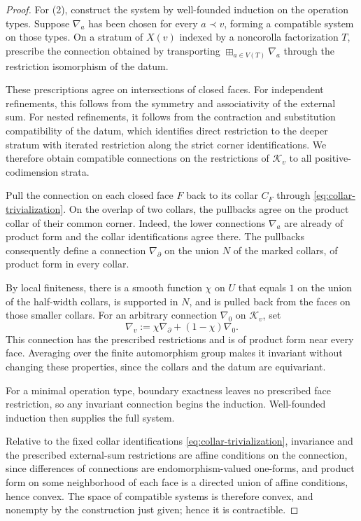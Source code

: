\documentclass[11pt,letterpaper,twoside]{article}
\theoremstyle{plain}
\theoremstyle{definition}
\theoremstyle{remark}
\begin{document}
\begin{proof}
For (2), construct the system by well-founded induction on the operation types.  Suppose \(\nabla_a\) has been chosen for every \(a\prec v\), forming a compatible system on those types.  On a stratum of \(X(v)\) indexed by a noncorolla factorization \(T\), prescribe the connection obtained by transporting \(\boxplus_{a\in V(T)}\nabla_a\) through the restriction isomorphism of the datum.

These prescriptions agree on intersections of closed faces.  For independent refinements, this follows from the symmetry and associativity of the external sum.  For nested refinements, it follows from the contraction and substitution compatibility of the datum, which identifies direct restriction to the deeper stratum with iterated restriction along the strict corner identifications.  We therefore obtain compatible connections on the restrictions of \(\mathcal K_v\) to all positive-codimension strata.

Pull the connection on each closed face \(F\) back to its collar \(C_F\) through \eqref{eq:collar-trivialization}.  On the overlap of two collars, the pullbacks agree on the product collar of their common corner.  Indeed, the lower connections \(\nabla_a\) are already of product form and the collar identifications agree there.  The pullbacks consequently define a connection \(\nabla_\partial\) on the union \(N\) of the marked collars, of product form in every collar.

By local finiteness, there is a smooth function \(\chi\) on \(U\) that equals \(1\) on the union of the half-width collars, is supported in \(N\), and is pulled back from the faces on those smaller collars.  For an arbitrary connection \(\nabla_0\) on \(\mathcal K_v\), set
\[
 \nabla_v:=\chi\nabla_\partial+(1-\chi)\nabla_0.
\]
This connection has the prescribed restrictions and is of product form near every face.  Averaging over the finite automorphism group makes it invariant without changing these properties, since the collars and the datum are equivariant.

For a minimal operation type, boundary exactness leaves no prescribed face restriction, so any invariant connection begins the induction.  Well-founded induction then supplies the full system.

Relative to the fixed collar identifications \eqref{eq:collar-trivialization}, invariance and the prescribed external-sum restrictions are affine conditions on the connection, since differences of connections are endomorphism-valued one-forms, and product form on some neighborhood of each face is a directed union of affine conditions, hence convex.  The space of compatible systems is therefore convex, and nonempty by the construction just given; hence it is contractible.
\end{proof}
\end{document}

